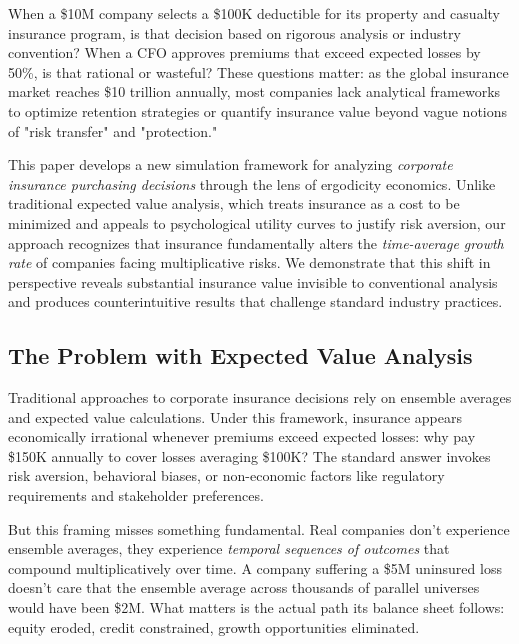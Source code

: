 \documentclass[11pt,letterpaper]{article}
\begin{document}
When a \$10M company selects a \$100K deductible for its property and casualty insurance program, is that decision based on rigorous analysis or industry convention? When a CFO approves premiums that exceed expected losses by 50\%, is that rational or wasteful? These questions matter: as the global insurance market reaches \$10 trillion annually, most companies lack analytical frameworks to optimize retention strategies or quantify insurance value beyond vague notions of "risk transfer" and "protection."

This paper develops a new simulation framework for analyzing \emph{corporate insurance purchasing decisions} through the lens of ergodicity economics. Unlike traditional expected value analysis, which treats insurance as a cost to be minimized and appeals to psychological utility curves to justify risk aversion, our approach recognizes that insurance fundamentally alters the \emph{time-average growth rate} of companies facing multiplicative risks. We demonstrate that this shift in perspective reveals substantial insurance value invisible to conventional analysis and produces counterintuitive results that challenge standard industry practices.

\subsection{The Problem with Expected Value Analysis}

Traditional approaches to corporate insurance decisions rely on ensemble averages and expected value calculations. Under this framework, insurance appears economically irrational whenever premiums exceed expected losses: why pay \$150K annually to cover losses averaging \$100K? The standard answer invokes risk aversion, behavioral biases, or non-economic factors like regulatory requirements and stakeholder preferences.

But this framing misses something fundamental. Real companies don't experience ensemble averages, they experience \emph{temporal sequences of outcomes} that compound multiplicatively over time. A company suffering a \$5M uninsured loss doesn't care that the ensemble average across thousands of parallel universes would have been \$2M. What matters is the actual path its balance sheet follows: equity eroded, credit constrained, growth opportunities eliminated.
\end{document}
